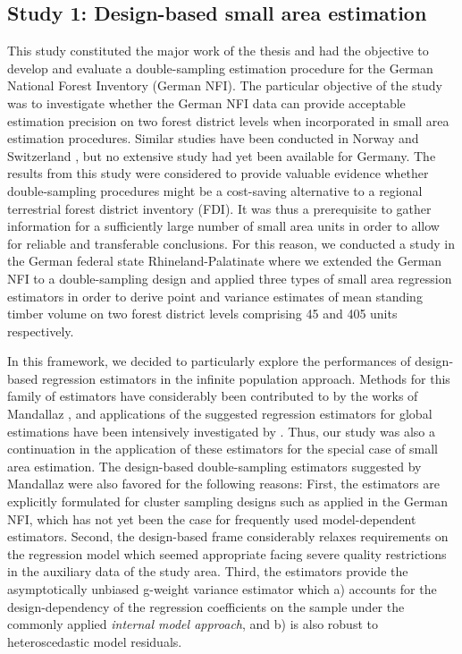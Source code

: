 \subsection{Study 1: Design-based small area estimation}


This study constituted the major work of the thesis and had the objective to develop and evaluate a double-sampling estimation procedure for the German National Forest Inventory (German NFI). The particular objective of the study was to investigate whether the German NFI data can provide acceptable estimation precision on two forest district levels when incorporated in small area estimation procedures. Similar studies have been conducted in Norway \citep{breidenbach2012} and Switzerland \citep{magnussen2014a, steinmann2013}, but no extensive study had yet been available for Germany. The results from this study were considered to provide valuable evidence whether double-sampling procedures might be a cost-saving alternative to a regional terrestrial forest district inventory (FDI). It was thus a prerequisite to gather information for a sufficiently large number of small area units in order to allow for reliable and transferable conclusions. For this reason, we conducted a study in the German federal state Rhineland-Palatinate where we extended the German NFI to a double-sampling design and applied three types of small area regression estimators in order to derive point and variance estimates of mean standing timber volume on two forest district levels comprising 45 and 405 units respectively.\par

In this framework, we decided to particularly explore the performances of design-based regression estimators in the infinite population approach. Methods for this family of estimators have considerably been contributed to by the works of Mandallaz \citep{mandallaz2008,mandallaz2013a, mandallaz2013b, mandallaz2013c}, and applications of the suggested regression estimators for global estimations have been intensively investigated by \citet{massey2015_thesis}. Thus, our study was also a continuation in the application of these estimators for the special case of small area estimation. The design-based double-sampling estimators suggested by Mandallaz were also favored for the following reasons: First, the estimators are explicitly formulated for cluster sampling designs such as applied in the German NFI, which has not yet been the case for frequently used model-dependent estimators. Second, the design-based frame considerably relaxes requirements on the regression model which seemed appropriate facing severe quality restrictions in the auxiliary data of the study area. Third, the estimators provide the asymptotically unbiased g-weight variance estimator which a) accounts for the design-dependency of the regression coefficients on the sample under the commonly applied \textit{internal model approach}, and b) is also robust to heteroscedastic model residuals.\par


